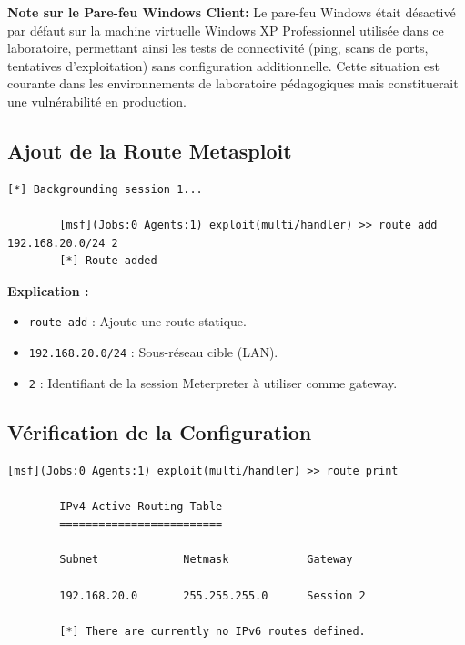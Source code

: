 \documentclass[12pt,a4paper,openany]{report}
\begin{document}
	\textbf{Note sur le Pare-feu Windows Client:} Le pare-feu Windows était 
	désactivé par défaut sur la machine virtuelle Windows XP Professionnel 
	utilisée dans ce laboratoire, permettant ainsi les tests de connectivité 
	(ping, scans de ports, tentatives d'exploitation) sans configuration 
	additionnelle. Cette situation est courante dans les environnements de 
	laboratoire pédagogiques mais constituerait une vulnérabilité en production.
	
	
	\subsection{Ajout de la Route Metasploit}
	
	\begin{lstlisting}[caption=Configuration du Routage]
		[*] Backgrounding session 1...
		
		[msf](Jobs:0 Agents:1) exploit(multi/handler) >> route add 192.168.20.0/24 2
		[*] Route added
	\end{lstlisting}
	
	\textbf{Explication :}
	\begin{itemize}
		\item \texttt{route add} : Ajoute une route statique.
		\item \texttt{192.168.20.0/24} : Sous-réseau cible (LAN).
		\item \texttt{2} : Identifiant de la session Meterpreter à utiliser comme gateway.
	\end{itemize}
	
	\subsection{Vérification de la Configuration}
	
	\begin{lstlisting}[caption=Affichage de la Table de Routage]
		[msf](Jobs:0 Agents:1) exploit(multi/handler) >> route print
		
		IPv4 Active Routing Table
		=========================
		
		Subnet             Netmask            Gateway
		------             -------            -------
		192.168.20.0       255.255.255.0      Session 2
		
		[*] There are currently no IPv6 routes defined.
	\end{lstlisting}
	
\end{document}
